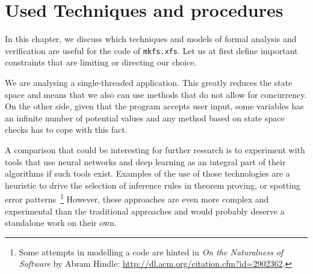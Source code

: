 
\chapter{Used Techniques and procedures}\label{chap:techniques}

In this chapter, we discuss which techniques and models of formal analysis and verification are useful for the code of {\tt mkfs.xfs}. Let us at first define important constraints that are limiting or directing our choice.

We are analysing a single-threaded application. This greatly reduces the
state space and means that we also can use methods that do not allow for
concurrency. On the other side, given that the program accepts user input,
some variables has an infinite number of potential values and any method
based on state space checks has to cope with this fact.


%

A comparison that could be interesting for further research is to experiment
with tools that use neural networks and deep learning as an integral part of
their algorithms if such tools exist. Examples of the use of those technologies
are a heuristic to drive the selection of inference rules in theorem proving,
or spotting error patterns~\footnote{Some attempts in modelling a code are
hinted in {\em On the Naturalness of Software} by Abram Hindle:
\url{http://dl.acm.org/citation.cfm?id=2902362}.} However, these approaches are
even more complex and experimental than the traditional approaches and
would probably deserve a standalone work on their own.

